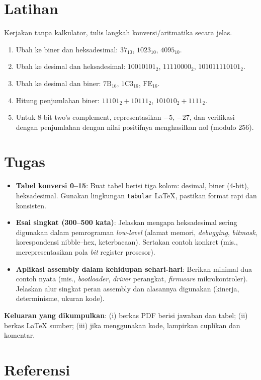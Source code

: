 \section{Latihan}
Kerjakan tanpa kalkulator, tulis langkah konversi/aritmatika secara jelas.
\begin{enumerate}
    \item Ubah ke biner dan heksadesimal: \(37_{10}\), \(1023_{10}\), \(4095_{10}\).
    \item Ubah ke desimal dan heksadesimal: \(10010101_2\), \(11110000_2\), \(101011110101_2\).
    \item Ubah ke desimal dan biner: \(\mathrm{7B}_{16}\), \(\mathrm{1C3}_{16}\), \(\mathrm{FE}_{16}\).
    \item Hitung penjumlahan biner: \(11101_2 + 10111_2\), \(101010_2 + 1111_2\).
    \item Untuk 8-bit two's complement, representasikan \(-5\), \(-27\), dan verifikasi dengan penjumlahan dengan nilai positifnya menghasilkan nol (modulo 256).
\end{enumerate}

\section{Tugas}
\begin{itemize}
    \item \textbf{Tabel konversi 0--15}: Buat tabel berisi tiga kolom: desimal, biner (4-bit), heksadesimal. Gunakan lingkungan \texttt{tabular} LaTeX, pastikan format rapi dan konsisten.
    \item \textbf{Esai singkat (300--500 kata)}: Jelaskan mengapa heksadesimal sering digunakan dalam pemrograman \textit{low-level} (alamat memori, \textit{debugging}, \textit{bitmask}, korespondensi nibble--hex, keterbacaan). Sertakan contoh konkret (mis., merepresentasikan pola \textit{bit} register prosesor).
    \item \textbf{Aplikasi assembly dalam kehidupan sehari-hari}: Berikan minimal dua contoh nyata (mis., \textit{bootloader}, \textit{driver} perangkat, \textit{firmware} mikrokontroler). Jelaskan alur singkat peran assembly dan alasannya digunakan (kinerja, determinisme, ukuran kode).
\end{itemize}
\noindent\textbf{Keluaran yang dikumpulkan}: (i) berkas PDF berisi jawaban dan tabel; (ii) berkas \LaTeX{} sumber; (iii) jika menggunakan kode, lampirkan cuplikan dan komentar.

\section{Referensi}
